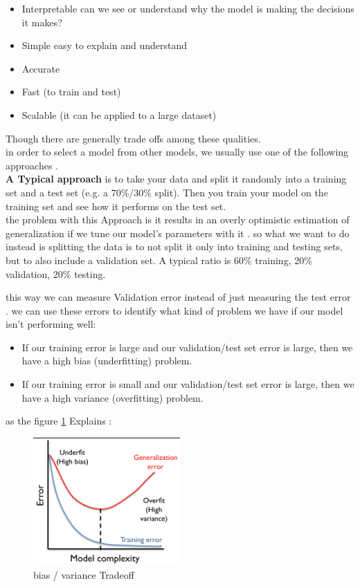 \begin{itemize}
\item Interpretable   can we see or understand why the model is making the decisions it makes?
\item Simple   easy to explain and understand
\item Accurate
\item Fast (to train and test)
\item Scalable (it can be applied to a large dataset)

\end{itemize}
Though there are generally trade offs among these qualities.\\in order to select a model from other models, we usually use one of the following approaches  .\\\textbf{A Typical approach } is to take your data and split it randomly into a training set and a test set (e.g. a 70\%/30\% split). Then you train your model on the training set and see how it performs on the test set.\\the problem with this Approach is it results in an overly optimistic estimation of generalization if we tune our model's parameters with it . so what we want to do instead is splitting the data is to not split it only into training and testing sets, but to also include a validation set. A typical ratio is 60\% training, 20\% validation, 20\% testing.

this way we can measure Validation error instead of just measuring the test error .
we can use these errors   to identify what kind of problem we have if our model isn't performing well:

\begin{itemize}
\item If our training error is large and our validation/test set error is large, then we have a high bias (underfitting) problem.
\item If our training error is small and our validation/test set error is large, then we have a high variance (overfitting) problem.
\end{itemize}

as the figure \ref{fig:bias} Explains : 

\begin{figure}[H]
\centering
\includegraphics[width=0.5\textwidth]{img/model.png}
\caption{ bias / variance Tradeoff}
\label{fig:bias}
\end{figure}

